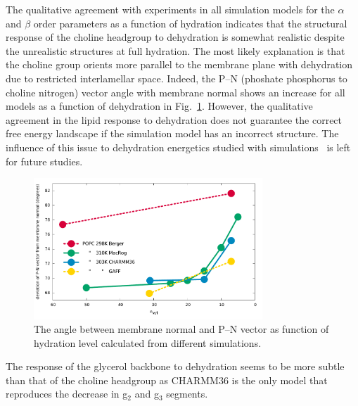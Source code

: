 \documentclass[pre,aps,floatfix,authordate1-4,twocolumn]{revtex4-1}
\begin{document}
The qualitative agreement with experiments in all simulation models for the $\alpha$ and $\beta$ order parameters  
as a function of hydration indicates that the structural response of the choline headgroup to dehydration is somewhat realistic
despite the unrealistic structures at full hydration. 
The most likely explanation is that the choline group
orients more parallel to the membrane plane with dehydration due to restricted interlamellar space. 
Indeed, the P--N (phoshate phosphorus to choline nitrogen) vector angle with membrane normal shows an increase for
all models as a function of dehydration in Fig.~\ref{PNangle}.
However, the qualitative agreement in the lipid response to dehydration does not guarantee the correct 
free energy landscape if the simulation model has an incorrect structure. The influence of this issue to 
dehydration energetics studied with simulations~\cite{eun09,schneck12} is left for future studies.
\begin{figure}[]
  \centering
  \includegraphics[width=8.6cm]{../DATAreportediINblog/dehydrationPN.pdf}

  \caption{\label{PNangle}
    The angle between membrane normal and P--N vector as function of
    hydration level calculated from different simulations.
  }
\end{figure}

The response of the glycerol backbone to dehydration seems to be more subtle than that of the choline headgroup 
as CHARMM36 is the only model that reproduces the decrease in g$_2$ and g$_3$ segments.
\end{document}
